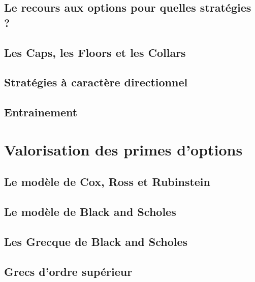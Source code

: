 \documentclass[a4paper, 12pt]{report}
\begin{document}
\subsection{Le recours aux options pour quelles stratégies ?}

\subsection{Les Caps, les Floors et les Collars}

\subsection{Stratégies à caractère directionnel}

\subsection{Entrainement}

\section{Valorisation des primes d'options}

\subsection{Le modèle de Cox, Ross et Rubinstein}

\subsection{Le modèle de Black and Scholes}

\subsection{Les Grecque de Black and Scholes}

\subsection{Grecs d'ordre supérieur}
\end{document}
